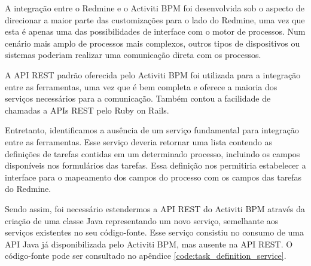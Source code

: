A integração entre o Redmine e o Activiti BPM foi desenvolvida sob o aspecto de direcionar a maior parte das customizações para o lado do Redmine, uma vez que esta é apenas uma das possibilidades de interface com o motor de processos. Num cenário mais amplo de processos mais complexos, outros tipos de dispositivos ou sistemas poderiam realizar uma comunicação direta com os processos.

A API REST padrão oferecida pelo Activiti BPM foi utilizada para a integração entre as ferramentas, uma vez que é bem completa e oferece a maioria dos serviços necessários para a comunicação. Também contou a facilidade de chamadas a APIs REST pelo Ruby on Rails. 

Entretanto, identificamos a ausência de um serviço fundamental para integração entre as ferramentas. Esse serviço deveria retornar uma lista contendo as definições de tarefas contidas em um determinado processo, incluindo os campos disponíveis nos formulários das tarefas. Essa definição nos permitiria estabelecer a interface para o mapeamento dos campos do processo com os campos das tarefas do Redmine.

Sendo assim, foi necessário estendermos a API REST do Activiti BPM através da criação de uma classe Java representando um novo serviço, semelhante aos serviços existentes no seu código-fonte. Esse serviço consistiu no consumo de uma API Java já disponibilizada pelo Activiti BPM, mas ausente na API REST. O código-fonte pode ser consultado no apêndice \ref{code:task_definition_service}.